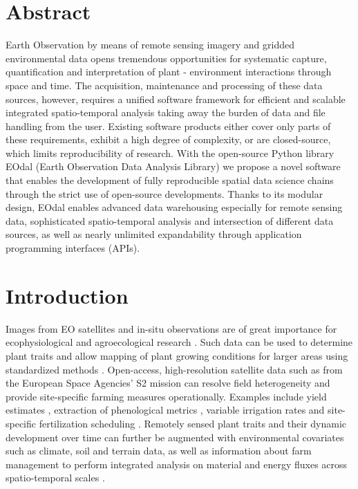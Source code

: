 \section*{Abstract}
Earth Observation by means of remote sensing imagery and gridded environmental data opens tremendous opportunities for systematic capture, quantification and interpretation of plant - environment interactions through space and time. The acquisition, maintenance and processing of these data sources, however, requires a unified software framework for efficient and scalable integrated spatio-temporal analysis taking away the burden of data and file handling from the user. Existing software products either cover only parts of these requirements, exhibit a high degree of complexity, or are closed-source, which limits reproducibility of research. With the open-source Python library EOdal (Earth Observation Data Analysis Library) we propose a novel software that enables the development of fully reproducible spatial data science chains through the strict use of open-source developments.
Thanks to its modular design, EOdal enables advanced data warehousing especially for remote sensing data, sophisticated spatio-temporal analysis and intersection of different data sources, as well as nearly unlimited expandability through application programming interfaces (APIs).

\section{Introduction}
Images from \gls{EO} satellites and in-situ observations are of great importance for ecophysiological \citep{caparros-santiago_land_2021} and agroecological research \citep{karthikeyan_review_2020}. Such data can be used to determine plant traits and allow mapping of plant growing conditions for larger areas using standardized methods \citep{weiss_remote_2020}. Open-access, high-resolution satellite data such as from the European Space Agencies' \gls{S2} mission can resolve field heterogeneity and provide site-specific farming measures operationally. Examples include yield estimates \citep{marshall_optimizing_2018,perich_pixel-based_2023}, extraction of phenological metrics \citep{duarte_qphenometrics_2018}, variable irrigation rates \citep{barker_evaluation_2018} and site-specific fertilization scheduling \citep{mittermayer_analysis_2022}. Remotely sensed plant traits and their dynamic development over time  can further be augmented with environmental covariates such as climate, soil and terrain data, as well as information about farm management to perform integrated analysis on material and energy fluxes across spatio-temporal scales \citep{asam_relationship_2018}.


